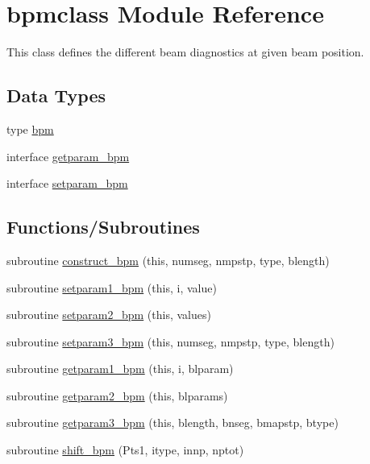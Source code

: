 \hypertarget{namespacebpmclass}{}\section{bpmclass Module Reference}
\label{namespacebpmclass}


This class defines the different beam diagnostics at given beam position.  


\subsection*{Data Types}
\begin{DoxyCompactItemize}
\item 
type \mbox{\hyperlink{namespacebpmclass_structbpmclass_1_1bpm}{bpm}}
\item 
interface \mbox{\hyperlink{interfacebpmclass_1_1getparam__bpm}{getparam\+\_\+bpm}}
\item 
interface \mbox{\hyperlink{interfacebpmclass_1_1setparam__bpm}{setparam\+\_\+bpm}}
\end{DoxyCompactItemize}
\subsection*{Functions/\+Subroutines}
\begin{DoxyCompactItemize}
\item 
subroutine \mbox{\hyperlink{namespacebpmclass_a777700e03d6422437747b159baf8ac47}{construct\+\_\+bpm}} (this, numseg, nmpstp, type, blength)
\item 
subroutine \mbox{\hyperlink{namespacebpmclass_ac6cf17939baa6ee32b20af627036c73e}{setparam1\+\_\+bpm}} (this, i, value)
\item 
subroutine \mbox{\hyperlink{namespacebpmclass_a37f4e426713e3624ee853c1343294cab}{setparam2\+\_\+bpm}} (this, values)
\item 
subroutine \mbox{\hyperlink{namespacebpmclass_a75a67023bf7f429ccd2ef12a435077a7}{setparam3\+\_\+bpm}} (this, numseg, nmpstp, type, blength)
\item 
subroutine \mbox{\hyperlink{namespacebpmclass_ac5588f058f6a85c7c6c131ca7172065d}{getparam1\+\_\+bpm}} (this, i, blparam)
\item 
subroutine \mbox{\hyperlink{namespacebpmclass_ae88ec9feb4f283a3914a0859b14dc8dc}{getparam2\+\_\+bpm}} (this, blparams)
\item 
subroutine \mbox{\hyperlink{namespacebpmclass_a290f2f59ee0b68d7f56e678b87f43393}{getparam3\+\_\+bpm}} (this, blength, bnseg, bmapstp, btype)
\item 
subroutine \mbox{\hyperlink{namespacebpmclass_af08cf75c879f797ae8f03ba69e95d628}{shift\+\_\+bpm}} (Pts1, itype, innp, nptot)
\end{DoxyCompactItemize}
